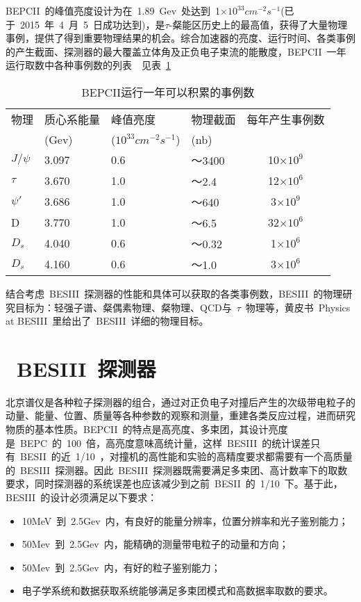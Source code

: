 BEPCII~的峰值亮度设计为在~1.89~Gev~处达到~1$\times$$10^{33}$$cm^{-2}$$s^{-1}$(已于~2015~年~4~月~5~日成功达到)，是$\tau$-粲能区历史上的最高值，获得了大量物理事例，提供了得到重要物理结果的机会。综合加速器的亮度、运行时间、各类事例的产生截面、探测器的最大覆盖立体角及正负电子束流的能散度，BEPCII~一年运行取数中各种事例数的列表~\cite{yuancz:2002}~见表~\ref{tbl:event-Number}~

\begin{table}[h]
    \centering
    \caption{\label{tbl:event-Number} BEPCII运行一年可以积累的事例数}
    \footnotesize
    \begin{tabular}{llllc}
        \hline
        物理& 质心系能量& 峰值亮度& 物理截面& 每年产生事例数 \\
             &(Gev)      &($10^{33} $$cm^{-2}$$s^{-1}$)& (nb)\\
        \hline
        $J/\psi$& 3.097& 0.6& ～3400&  10$\times$$10^{9}$ \\
        $\tau$&   3.670& 1.0& ～2.4&    12$\times$$10^{6}$ \\
        $\psi'$&  3.686& 1.0& ～640&    3$\times$$10^{9}$\\
        D&        3.770& 1.0& ～6.5&    32$\times$$10^{6}$\\
        $D_{s}$&   4.040& 0.6& ～0.32&   1$\times$$10^{6}$\\
        $D_{s}$&   4.160& 0.6& ～1.0&    3$\times$$10^{6}$\\
        \hline
    \end{tabular}
\end{table}

结合考虑~BESIII~探测器的性能和具体可以获取的各类事例数，BESIII~的物理研究目标为：轻强子谱、粲偶素物理、粲物理、QCD与~$\tau$~物理等，黄皮书~Physics at BESIII~里给出了~BESIII~详细的物理目标。\cite{chaokt:2009}~\cite{wangyf2011}~

\section{~BESIII~探测器}
北京谱仪是各种粒子探测器的组合，通过对正负电子对撞后产生的次级带电粒子的动量、能量、位置、质量等各种参数的观察和测量，重建各类反应过程，进而研究物质的基本性质。BEPCII~的特点是高亮度、多束团，其设计亮度是~BEPC~的~100~倍，高亮度意味高统计量，这样~BESIII~的统计误差只有~BESII~的近~1/10~，对撞机的高性能和实验的高精度要求都需要有一个高质量的~BESIII~探测器。因此~BESIII~探测器既需要满足多束团、高计数率下的取数要求，同时探测器的系统误差也应该减少到之前~BESII~的~1/10~下。基于此，BESIII~的设计必须满足以下要求：
\begin{itemize}
\item{10MeV~到~2.5Gev~内，有良好的能量分辨率，位置分辨率和光子鉴别能力；}
\item{50Mev~到~2.5Gev~内，能精确的测量带电粒子的动量和方向；}
\item{50Mev~到~2.5Gev~内，有好的粒子鉴别能力；}
\item{电子学系统和数据获取系统能够满足多束团模式和高数据率取数的要求。}
\end{itemize}

